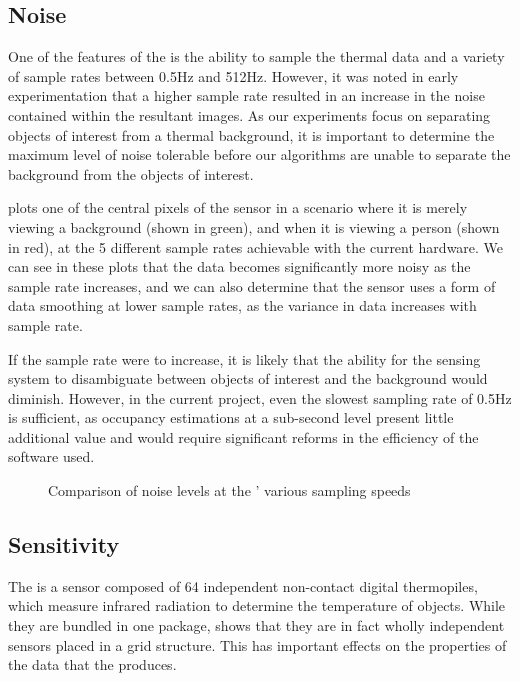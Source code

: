 \documentclass[../thesis/thesis.tex]{subfiles}
\begin{document}
\subsection{Noise}

One of the features of the \mlx is the ability to sample the thermal data and a variety of sample rates between 0.5Hz and 512Hz. However, it was noted in early experimentation that a higher sample rate resulted in an increase in the noise contained within the resultant images. As our experiments focus on separating objects of interest from a thermal background, it is important to determine the maximum level of noise tolerable before our algorithms are unable to separate the background from the objects of interest.

 plots one of the central pixels of the sensor in a scenario where it is merely viewing a background (shown in green), and when it is viewing a person (shown in red), at the 5 different sample rates achievable with the current hardware. We can see in these plots that the data becomes significantly more noisy as the sample rate increases, and we can also determine that the sensor uses a form of data smoothing at lower sample rates, as the variance in data increases with sample rate.

If the sample rate were to increase, it is likely that the ability for the sensing system to disambiguate between objects of interest and the background would diminish. However, in the current project, even the slowest sampling rate of 0.5Hz is sufficient, as occupancy estimations at a sub-second level present little additional value and would require significant reforms in the efficiency of the software used.


\begin{figure}
  \centering
\caption{Comparison of noise levels at the \mlx' various sampling speeds}
\label{fig:noise}
\end{figure}


\subsection{Sensitivity}

The \mlx is a sensor composed of 64 independent non-contact digital thermopiles, which measure infrared radiation to determine the temperature of objects. While they are bundled in one package,  shows that they are in fact wholly independent sensors placed in a grid structure. This has important effects on the properties of the data that the \mlx produces. 
\end{document}
